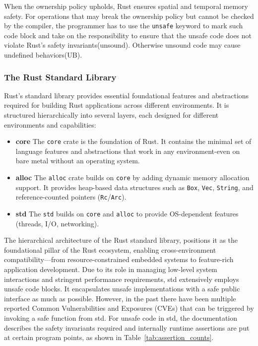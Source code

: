 \documentclass[conference]{IEEEtran}
\begin{document}
When the ownership policy upholds, Rust ensures spatial and temporal memory safety. For operations that may break the ownership policy but cannot be checked by the compiler, the programmer has to use the \texttt{unsafe} keyword to mark such code block and take on the responsibility to ensure that the unsafe code does not violate Rust's safety invariants(unsound). Otherwise unsound code may cause undefined behaviors(UB).

\subsubsection{The Rust Standard Library}
Rust's standard library provides essential foundational features and abstractions required for building Rust applications across different environments. It is structured hierarchically into several layers, each designed for different environments and capabilities:
\begin{itemize}
        \item \textbf{core} The \texttt{core} crate is the foundation of Rust. It contains the minimal set of language features and abstractions that work in any environment-even on bare metal without an operating system.
        \item \textbf{alloc} The \texttt{alloc} crate builds on \texttt{core} by adding dynamic memory allocation support. It provides heap-based data structures such as \texttt{Box}, \texttt{Vec}, \texttt{String}, and reference-counted pointers (\texttt{Rc}/\texttt{Arc}).
        \item \textbf{std} The \texttt{std} builds on \texttt{core} and \texttt{alloc} to provide OS-dependent features (threads, I/O, networking).
\end{itemize}

The hierarchical architecture of the Rust standard library, positions it as the foundational pillar of the Rust ecosystem, enabling cross-environment compatibility—from resource-constrained embedded systems to feature-rich application development. Due to its role in managing low-level system interactions and stringent performance requirements, std extensively employs unsafe code blocks. It encapsulates unsafe implementations with a safe public interface as much as possible. However, in the past there have been multiple reported Common Vulnerabilities and Exposures (CVEs)\cite{Qwaz_rust-cve} that can be triggered by invoking a safe function from std. For unsafe code in std, the documentation describes the safety invariants required and internally runtime assertions are put at certain program points, as shown in Table~\ref{tab:assertion_counts}.   
\end{document}
